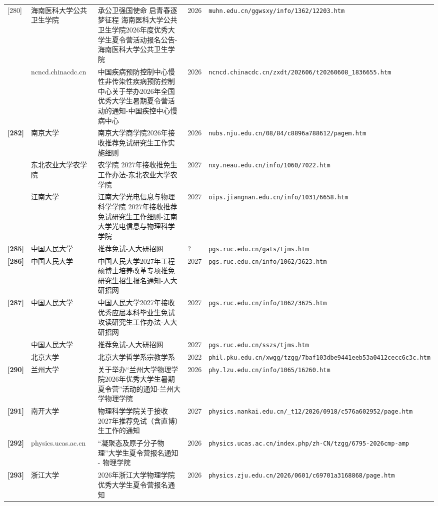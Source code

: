 {\begin{longtable}{@{}p{1.15cm}p{2.9cm}p{6.3cm}p{0.85cm}p{5.0cm}@{}}
[280] & 海南医科大学公共卫生学院 & 承公卫强国使命 启青春逐梦征程 海南医科大学公共卫生学院2026年度优秀大学生夏令营活动报名公告-海南医科大学公共卫生学院 & 2026 & \texttt{muhn.edu.cn/ggwsxy/info/1362/12203.htm} \\
[281] & ncncd.chinacdc.cn & 中国疾病预防控制中心慢性非传染性疾病预防控制中心关于举办2026年全国优秀大学生暑期夏令营活动的通知-中国疾控中心慢病中心 & 2026 & \texttt{ncncd.chinacdc.cn/zxdt/202606/t20260608\_1836655.htm} \\
\textbf{[282]} & 南京大学 & 南京大学商学院2026年接收推荐免试研究生工作实施细则 & 2026 & \texttt{nubs.nju.edu.cn/08/84/c8896a788612/pagem.htm} \\
[283] & 东北农业大学农学院 & 农学院 2027年接收推免生工作办法-东北农业大学农学院 & 2027 & \texttt{nxy.neau.edu.cn/info/1060/7022.htm} \\
[284] & 江南大学 & 江南大学光电信息与物理科学学院 2027年接收推荐免试研究生工作细则-江南大学光电信息与物理科学学院 & 2027 & \texttt{oips.jiangnan.edu.cn/info/1031/6658.htm} \\
\textbf{[285]} & 中国人民大学 & 推荐免试-人大研招网 & ? & \texttt{pgs.ruc.edu.cn/gats/tjms.htm} \\
\textbf{[286]} & 中国人民大学 & 中国人民大学2027年工程硕博士培养改革专项推免研究生招生报名通知-人大研招网 & 2027 & \texttt{pgs.ruc.edu.cn/info/1062/3623.htm} \\
\textbf{[287]} & 中国人民大学 & 中国人民大学2027年接收优秀应届本科毕业生免试攻读研究生工作办法-人大研招网 & 2027 & \texttt{pgs.ruc.edu.cn/info/1062/3625.htm} \\
[288] & 中国人民大学 & 推荐免试-人大研招网 & 2027 & \texttt{pgs.ruc.edu.cn/sszs/tjms.htm} \\
[289] & 北京大学 & 北京大学哲学系宗教学系 & 2022 & \texttt{phil.pku.edu.cn/xwgg/tzgg/7baf103dbe9441eeb53a0412cecc6c3c.htm} \\
\textbf{[290]} & 兰州大学 & 关于举办“兰州大学物理学院2026年优秀大学生暑期夏令营”活动的通知-兰州大学物理学院 & 2026 & \texttt{phy.lzu.edu.cn/info/1065/16260.htm} \\
\textbf{[291]} & 南开大学 & 物理科学学院关于接收2027年推荐免试（含直博）生工作的通知 & 2027 & \texttt{physics.nankai.edu.cn/\_t12/2026/0918/c576a602952/page.htm} \\
\textbf{[292]} & physics.ucas.ac.cn & “凝聚态及原子分子物理”大学生夏令营报名通知 - 物理学院 & 2026 & \texttt{physics.ucas.ac.cn/index.php/zh-CN/tzgg/6795-2026cmp-amp} \\
\textbf{[293]} & 浙江大学 & 2026年浙江大学物理学院优秀大学生夏令营报名通知 & 2026 & \texttt{physics.zju.edu.cn/2026/0601/c69701a3168868/page.htm} \\

\end{longtable}}

